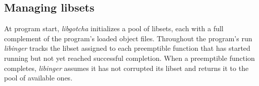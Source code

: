 \subsection{Managing libsets}
\label{sec:gotchainit}

At program start, \textit{libgotcha} initializes a pool of libsets, each with a full
complement of the program's loaded object files.  Throughout the program's run
\textit{libinger} tracks the libset assigned to each preemptible function that has
started running but not yet reached successful completion.  When a preemptible
function completes, \textit{libinger} assumes it has not corrupted its libset and
returns it to the pool of available ones.
